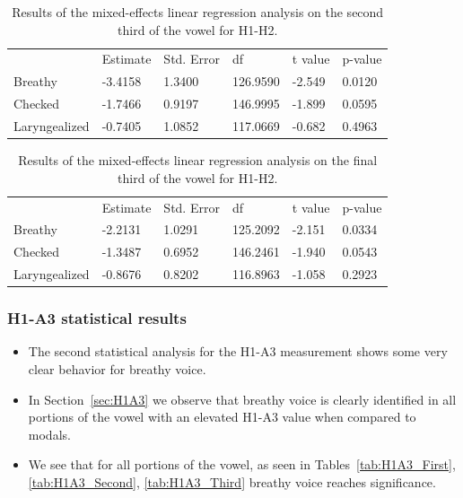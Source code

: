 \documentclass[12pt, letterpaper]{article}
\providecommand{\lsptoprule}{\midrule\toprule}
\providecommand{\lspbottomrule}{\bottomrule\midrule}
\begin{document}
\begin{table}[!h]
	\centering
	\caption{Results of the mixed-effects linear regression analysis on the second third of the vowel for H1-H2. }
	\label{tab:H1H2_Second}
	 \begin{tabular}{llllll}
	  \lsptoprule
						&  Estimate  & Std. Error & df & t value & p-value \\
	  	Breathy   		&  -3.4158  &   1.3400 & 126.9590 &  -2.549  &  0.0120 \\
		Checked    		&  -1.7466  &   0.9197 & 146.9995 &  -1.899  &  0.0595 \\
		Laryngealized	&  -0.7405  &   1.0852 & 117.0669 &  -0.682  &  0.4963 \\
	  \lspbottomrule
	 \end{tabular}
\end{table}

\begin{table}[!h]
	\centering
	\caption{Results of the mixed-effects linear regression analysis on the final third of the vowel for H1-H2. }
	\label{tab:H1H2_Third}
	 \begin{tabular}{llllll}
	  \lsptoprule
						&  Estimate  & Std. Error & df & t value & p-value \\
	  	Breathy   		&  -2.2131  &   1.0291 & 125.2092 &  -2.151  &  0.0334 \\
		Checked    		&  -1.3487  &   0.6952 & 146.2461 &  -1.940  &  0.0543 \\
		Laryngealized	&  -0.8676  &   0.8202 & 116.8963 &  -1.058  &  0.2923 \\
	  \lspbottomrule
	 \end{tabular}
\end{table}

\subsubsection{H1-A3 statistical results} \label{sec:StatsH1A3}

\begin{itemize}
	\item The second statistical analysis for the H1-A3 measurement shows some very clear behavior for breathy voice. 
	\item In Section~\ref{sec:H1A3} we observe that breathy voice is clearly identified in all portions of the vowel with an elevated H1-A3 value when compared to modals. 
	\item We see that for all portions of the vowel, as seen in Tables~\ref{tab:H1A3_First}, \ref{tab:H1A3_Second}, \ref{tab:H1A3_Third} breathy voice reaches significance.
\end{itemize}
  
\end{document}
